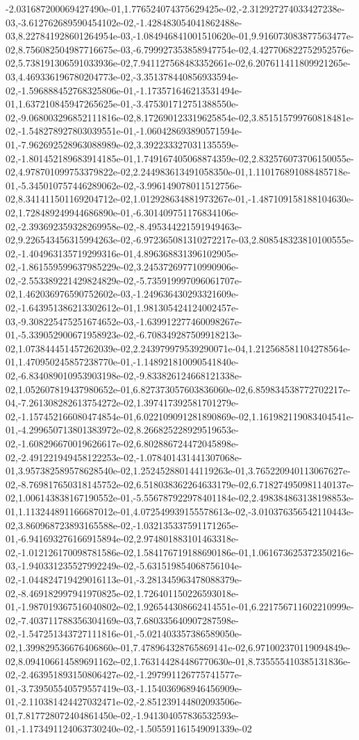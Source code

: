 -2.031687200069427490e-01,1.776524074375629425e-02,-2.312927274033427238e-03,-3.612762689590454102e-02,-1.428483054041862488e-03,8.227841928601264954e-03,-1.084946841001510620e-01,9.916073083877563477e-02,8.756082504987716675e-03,-6.799927353858947754e-02,4.427706822752952576e-02,5.738191306591033936e-02,7.941127568483352661e-02,6.207611411809921265e-03,4.469336196780204773e-02,-3.351378440856933594e-02,-1.596888452768325806e-01,-1.173571646213531494e-01,1.637210845947265625e-01,-3.475301712751388550e-02,-9.068003296852111816e-02,8.172690123319625854e-02,3.851515799760818481e-02,-1.548278927803039551e-01,-1.060428693890571594e-01,-7.962692528963088989e-02,3.392233327031135559e-02,-1.801452189683914185e-01,1.749167405068874359e-02,2.832576073706150055e-02,4.978701099753379822e-02,2.244983613491058350e-01,1.110176891088485718e-01,-5.345010757446289062e-02,-3.996149078011512756e-02,8.341411501169204712e-02,1.012928634881973267e-01,-1.487109158188104630e-02,1.728489249944686890e-01,-6.301409751176834106e-02,-2.393692359328269958e-02,-8.495344221591949463e-02,9.226543456315994263e-02,-6.972365081310272217e-03,2.808548323810100555e-02,-1.404963135719299316e-01,4.896368831396102905e-02,-1.861559599637985229e-02,3.245372697710990906e-02,-2.553389221429824829e-02,-5.735919997096061707e-02,1.462036976590752602e-03,-1.249636430293321609e-02,-1.643951386213302612e-01,1.981305424124002457e-03,-9.308225475251674652e-03,-1.639912277460098267e-01,-5.339052900671958923e-02,-6.708349287509918213e-02,1.073844451457262039e-02,2.243979979539290071e-04,1.212568581104278564e-01,1.470950245857238770e-01,-1.148921810090541840e-02,-6.834089010953903198e-02,-9.833826124668121338e-02,1.052607819437980652e-01,6.827373057603836060e-02,6.859834538772702217e-04,-7.261308282613754272e-02,1.397417392581701279e-02,-1.157452166080474854e-01,6.022109091281890869e-02,1.161982119083404541e-01,-4.299650713801383972e-02,8.266825228929519653e-02,-1.608296670019626617e-02,6.802886724472045898e-02,-2.491221949458122253e-02,-1.078401431441307068e-01,3.957382589578628540e-02,1.252452880144119263e-01,3.765220940113067627e-02,-8.769817650318145752e-02,6.518038362264633179e-02,6.718274950981140137e-02,1.006143838167190552e-01,-5.556787922978401184e-02,2.498384863138198853e-01,1.113244891166687012e-01,4.072549939155578613e-02,-3.010376356542110443e-02,3.860968723893165588e-02,-1.032135337591171265e-01,-6.941693276166915894e-02,2.974801883101463318e-02,-1.012126170098781586e-02,1.584176719188690186e-01,1.061673625372350216e-03,-1.940331235527992249e-02,-5.631519854068756104e-02,-1.044824719429016113e-01,-3.281345963478088379e-02,-8.469182997941970825e-02,1.726401150226593018e-01,-1.987019367516040802e-02,1.926544308662414551e-01,6.221756711602210999e-02,-7.403711788356304169e-03,7.680335640907287598e-02,-1.547251343727111816e-01,-5.021403357386589050e-02,1.399829536676406860e-01,7.478964328765869141e-02,6.971002370119094849e-02,8.094106614589691162e-02,1.763144284486770630e-01,8.735555410385131836e-02,-2.463951893150806427e-02,-1.297991126775741577e-01,-3.739505540579557419e-03,-1.154036968946456909e-01,-2.110381424427032471e-02,-2.851239144802093506e-01,7.817728072404861450e-02,-1.941304057836532593e-01,-1.173491124063730240e-02,-1.505591161549091339e-02
